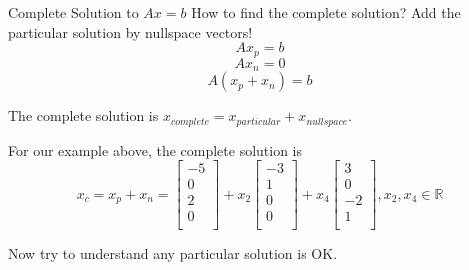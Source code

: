 \documentclass{beamer}
\begin{document}
\begin{frame}{Complete Solution to $Ax=b$}
How to find the complete solution? Add the particular solution by nullspace vectors!
\begin{equation*}
    Ax_p=b
\end{equation*}
\begin{equation*}
    Ax_n=0
\end{equation*}
\begin{equation*}
    A(x_p+x_n)=b
\end{equation*}

The complete solution is $x_{complete}=x_{particular}+x_{nullspace}$.

\vspace{3pt}
For our example above, the complete solution is
\begin{equation*}
    x_c=x_p+x_n=\left[ \begin{array}{c}
        -5\\
        0\\
        2\\
        0\\
    \end{array} \right] +x_2\left[ \begin{array}{c}
        -3\\
        1\\
        0\\
        0\\
    \end{array} \right] +x_4\left[ \begin{array}{c}
        3\\
        0\\
        -2\\
        1\\
    \end{array} \right], x_2, x_4 \in \mathbb{R}
\end{equation*}

Now try to understand any particular solution is OK.
\end{frame}
\end{document}
